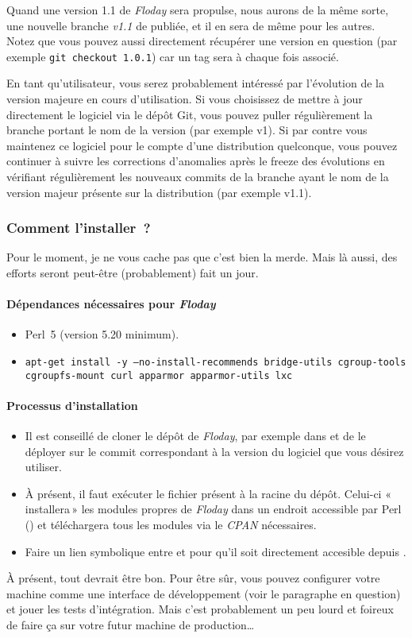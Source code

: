 Quand une version 1.1 de \emph{Floday} sera \gls{propulse}, nous aurons de la même sorte, une nouvelle branche \emph{v1.1} de publiée, et il en sera de même pour les autres.
Notez que vous pouvez aussi directement récupérer une version en question (par exemple {\tt git checkout 1.0.1}) car un tag sera à chaque fois associé.

En tant qu'utilisateur, vous serez probablement intéressé par l'évolution de la version majeure en cours d'utilisation. Si vous choisissez de mettre à jour directement le logiciel via le dépôt Git, vous pouvez puller régulièrement la branche portant le nom de la version (par exemple v1).
Si par contre vous maintenez ce logiciel pour le compte d'une distribution quelconque, vous pouvez continuer à suivre les corrections d'anomalies après le freeze des évolutions en vérifiant régulièrement les nouveaux commits de la branche ayant le nom de la version majeur présente sur la distribution (par exemple v1.1).

\subsubsection{Comment l'installer~?}

Pour le moment, je ne vous cache pas que c'est bien la merde.
Mais là aussi, des efforts seront peut-être (probablement) fait un jour.

\paragraph{Dépendances nécessaires pour \emph{Floday}}
\begin{itemize}
	\item Perl~5 (version 5.20 minimum).
	\item \texttt{apt-get install -y --no-install-recommends bridge-utils cgroup-tools\\cgroupfs-mount curl apparmor apparmor-utils lxc}
\end{itemize}

\paragraph{Processus d'installation}

\begin{itemize}
	\item Il est conseillé de cloner le dépôt de \emph{Floday}, par exemple dans  et de le déployer sur le commit correspondant à la version du logiciel que vous désirez utiliser.
	\item À présent, il faut exécuter le fichier  présent à la racine du dépôt.
		Celui-ci «\,installera\,» les modules propres de \emph{Floday} dans un endroit accessible par Perl () et téléchargera tous les modules via le \emph{CPAN} nécessaires.
	\item Faire un lien symbolique entre  et  pour qu'il soit directement accesible depuis .
\end{itemize}

À présent, tout devrait être bon. Pour être sûr, vous pouvez configurer votre machine comme une interface de développement (voir le paragraphe en question) et jouer les tests d'intégration.
Mais c'est probablement un peu lourd et foireux de faire ça sur votre futur machine de production\dots
